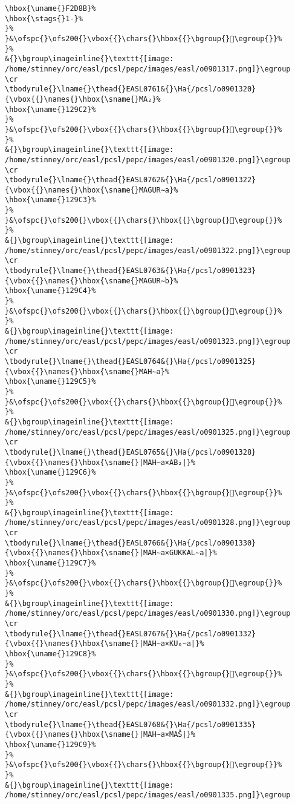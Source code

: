 \begin{verbatim}
\hbox{\uname{}F2D8B}%
\hbox{\stags{}1-}%
}%
}&\ofspc{}\ofs200{}\vbox{{}\chars{}\hbox{{}\bgroup{}󲶋\egroup{}}%
}%
&{}\bgroup\imageinline{}\texttt{[image: /home/stinney/orc/easl/pcsl/pepc/images/easl/o0901317.png]}\egroup
\cr
\tbodyrule{}\lname{}\thead{}EASL0761&{}\Ha{/pcsl/o0901320}{\vbox{{}\names{}\hbox{\sname{}MA₂}%
\hbox{\uname{}129C2}%
}%
}&\ofspc{}\ofs200{}\vbox{{}\chars{}\hbox{{}\bgroup{}𒧂\egroup{}}%
}%
&{}\bgroup\imageinline{}\texttt{[image: /home/stinney/orc/easl/pcsl/pepc/images/easl/o0901320.png]}\egroup
\cr
\tbodyrule{}\lname{}\thead{}EASL0762&{}\Ha{/pcsl/o0901322}{\vbox{{}\names{}\hbox{\sname{}MAGUR∼a}%
\hbox{\uname{}129C3}%
}%
}&\ofspc{}\ofs200{}\vbox{{}\chars{}\hbox{{}\bgroup{}𒧃\egroup{}}%
}%
&{}\bgroup\imageinline{}\texttt{[image: /home/stinney/orc/easl/pcsl/pepc/images/easl/o0901322.png]}\egroup
\cr
\tbodyrule{}\lname{}\thead{}EASL0763&{}\Ha{/pcsl/o0901323}{\vbox{{}\names{}\hbox{\sname{}MAGUR∼b}%
\hbox{\uname{}129C4}%
}%
}&\ofspc{}\ofs200{}\vbox{{}\chars{}\hbox{{}\bgroup{}𒧄\egroup{}}%
}%
&{}\bgroup\imageinline{}\texttt{[image: /home/stinney/orc/easl/pcsl/pepc/images/easl/o0901323.png]}\egroup
\cr
\tbodyrule{}\lname{}\thead{}EASL0764&{}\Ha{/pcsl/o0901325}{\vbox{{}\names{}\hbox{\sname{}MAH∼a}%
\hbox{\uname{}129C5}%
}%
}&\ofspc{}\ofs200{}\vbox{{}\chars{}\hbox{{}\bgroup{}𒧅\egroup{}}%
}%
&{}\bgroup\imageinline{}\texttt{[image: /home/stinney/orc/easl/pcsl/pepc/images/easl/o0901325.png]}\egroup
\cr
\tbodyrule{}\lname{}\thead{}EASL0765&{}\Ha{/pcsl/o0901328}{\vbox{{}\names{}\hbox{\sname{}|MAH∼a×AB₂|}%
\hbox{\uname{}129C6}%
}%
}&\ofspc{}\ofs200{}\vbox{{}\chars{}\hbox{{}\bgroup{}𒧆\egroup{}}%
}%
&{}\bgroup\imageinline{}\texttt{[image: /home/stinney/orc/easl/pcsl/pepc/images/easl/o0901328.png]}\egroup
\cr
\tbodyrule{}\lname{}\thead{}EASL0766&{}\Ha{/pcsl/o0901330}{\vbox{{}\names{}\hbox{\sname{}|MAH∼a×GUKKAL∼a|}%
\hbox{\uname{}129C7}%
}%
}&\ofspc{}\ofs200{}\vbox{{}\chars{}\hbox{{}\bgroup{}𒧇\egroup{}}%
}%
&{}\bgroup\imageinline{}\texttt{[image: /home/stinney/orc/easl/pcsl/pepc/images/easl/o0901330.png]}\egroup
\cr
\tbodyrule{}\lname{}\thead{}EASL0767&{}\Ha{/pcsl/o0901332}{\vbox{{}\names{}\hbox{\sname{}|MAH∼a×KU₆∼a|}%
\hbox{\uname{}129C8}%
}%
}&\ofspc{}\ofs200{}\vbox{{}\chars{}\hbox{{}\bgroup{}𒧈\egroup{}}%
}%
&{}\bgroup\imageinline{}\texttt{[image: /home/stinney/orc/easl/pcsl/pepc/images/easl/o0901332.png]}\egroup
\cr
\tbodyrule{}\lname{}\thead{}EASL0768&{}\Ha{/pcsl/o0901335}{\vbox{{}\names{}\hbox{\sname{}|MAH∼a×MAŠ|}%
\hbox{\uname{}129C9}%
}%
}&\ofspc{}\ofs200{}\vbox{{}\chars{}\hbox{{}\bgroup{}𒧉\egroup{}}%
}%
&{}\bgroup\imageinline{}\texttt{[image: /home/stinney/orc/easl/pcsl/pepc/images/easl/o0901335.png]}\egroup

\end{verbatim}
